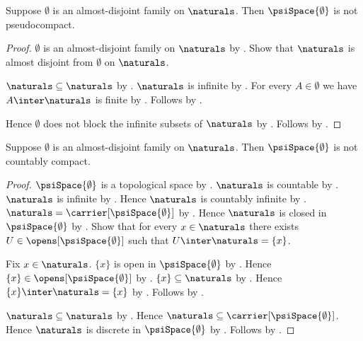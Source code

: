 \begin{theorem}\label{empty_psi_space_is_not_pseudocompact}
    Suppose $\emptyset$ is an almost-disjoint family on
        $\naturals$.
    Then $\psiSpace{\emptyset}$ is not pseudocompact.
\end{theorem}
\begin{proof}
    $\emptyset$ is an almost-disjoint family on $\naturals$ by
        .
    Show that $\naturals$ is almost disjoint from $\emptyset$ on
        $\naturals$.
    \begin{subproof}
        $\naturals\subseteq\naturals$ by .
        $\naturals$ is infinite by .
        For every $A\in\emptyset$ we have $A\inter\naturals$ is finite
            by .
        Follows by .
    \end{subproof}
    Hence $\emptyset$ does not block the infinite subsets of $\naturals$
        by .
    Follows by .
\end{proof}

\begin{theorem}\label{empty_psi_space_is_not_countably_compact}
    Suppose $\emptyset$ is an almost-disjoint family on
        $\naturals$.
    Then $\psiSpace{\emptyset}$ is not countably compact.
\end{theorem}
\begin{proof}
    $\psiSpace{\emptyset}$ is a topological space by
        .
    $\naturals$ is countable by .
    $\naturals$ is infinite by .
    Hence $\naturals$ is countably infinite by
        .
    $\naturals=\carrier[\psiSpace{\emptyset}]$ by
        .
    Hence $\naturals$ is closed in $\psiSpace{\emptyset}$ by
        .
    Show that for every $x\in\naturals$ there exists
        $U\in\opens[\psiSpace{\emptyset}]$ such that
            $U\inter\naturals=\{x\}$.
    \begin{subproof}
        Fix $x\in\naturals$.
        $\{x\}$ is open in $\psiSpace{\emptyset}$ by
            .
        Hence $\{x\}\in\opens[\psiSpace{\emptyset}]$ by
            .
        $\{x\}\subseteq\naturals$ by .
        Hence $\{x\}\inter\naturals=\{x\}$ by
            .
        Follows by \auto.
    \end{subproof}
    $\naturals\subseteq\naturals$ by .
    Hence $\naturals\subseteq\carrier[\psiSpace{\emptyset}]$.
    Hence $\naturals$ is discrete in $\psiSpace{\emptyset}$ by
        .
    Follows by
        .
\end{proof}

